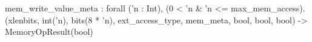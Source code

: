 mem_write_value_meta : forall ('n : Int), (0 < 'n & 'n <= max_mem_access).
  (xlenbits, int('n), bits(8 * 'n), ext_access_type, mem_meta, bool, bool, bool) -> MemoryOpResult(bool)
